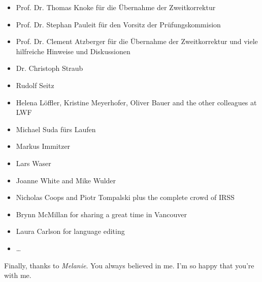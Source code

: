 \begin{itemize}
	\item Prof. Dr. Thomas Knoke für die Übernahme der Zweitkorrektur
	\item Prof. Dr. Stephan Pauleit für den Vorsitz der Prüfungskommision
	\item Prof. Dr. Clement Atzberger für die Übernahme der Zweitkorrektur und viele hilfreiche Hinweise und Diskussionen
	\item Dr. Christoph Straub
	\item Rudolf Seitz
	\item Helena Löffler, Kristine Meyerhofer, Oliver Bauer and the other colleagues at LWF
	\item Michael Suda fürs Laufen
	\item Markus Immitzer
	\item Lars Waser
	\item Joanne White and Mike Wulder
	\item Nicholas Coops and Piotr Tompalski plus the complete crowd of IRSS
	\item Brynn McMillan for sharing a great time in Vancouver
	\item Laura Carlson for language editing
	\item \dots
\end{itemize}

\noindent Finally, thanks to \emph{Melanie}. You always believed in me. I'm so happy that you're with me.

\endgroup



